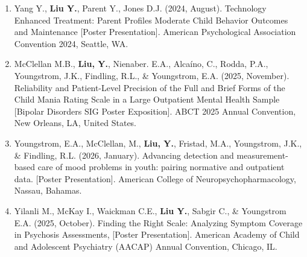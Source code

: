 \documentclass[12pt]{article}
\begin{document}
\begin{enumerate}
    \item Yang Y., \textbf{Liu Y.}, Parent Y., Jones D.J. (2024, August). Technology Enhanced Treatment: Parent Profiles Moderate Child Behavior Outcomes and Maintenance [Poster Presentation]. American Psychological Association Convention 2024, Seattle, WA.
    
    \item McClellan M.B., \textbf{Liu, Y.}, Nienaber. E.A., Alcaíno, C., Rodda, P.A., Youngstrom, J.K., Findling, R.L., \& Youngstrom, E.A. (2025, November). Reliability and Patient-Level Precision of the Full and Brief Forms of the Child Mania Rating Scale in a Large Outpatient Mental Health Sample [Bipolar Disorders SIG Poster Exposition]. ABCT 2025 Annual Convention, New Orleans, LA, United States.

    \item Youngstrom, E.A., McClellan, M., \textbf{Liu, Y.}, Fristad, M.A., Youngstrom, J.K., \& Findling, R.L. (2026, January). Advancing detection and measurement-based care of mood problems in youth: pairing normative and outpatient data. [Poster Presentation]. American College of Neuropsychopharmacology, Nassau, Bahamas.
    
    \item Yilanli M., McKay I., Waickman C.E., \textbf{Liu Y.}, Sabgir C., \& Youngstrom E.A. (2025, October). Finding the Right Scale: Analyzing Symptom Coverage in Psychosis Assessments, [Poster Presentation]. American Academy of Child and Adolescent Psychiatry (AACAP) Annual Convention, Chicago, IL.
\end{enumerate}
\end{document}
